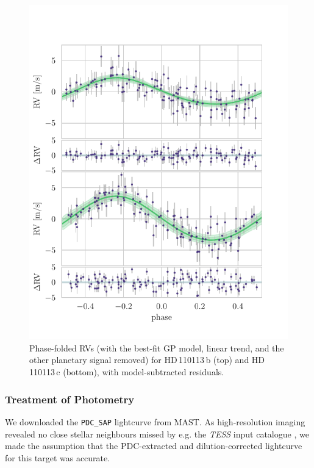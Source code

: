 \documentclass[fleqn,usenatbib]{mnras}
\newcommand{\tess}{{\it TESS}}
\newcommand{\Tplanet}{HD\,110113\,b}
\newcommand{\Tplanetc}{HD\,110113\,c}
\begin{document}
\begin{figure}
	\includegraphics[width=\columnwidth, trim={0.1cm 0.8cm 1.0cm 0.85cm}]{Phase_folded_RV_plots_3_GPs_final.pdf}
    \caption{Phase-folded RVs (with the best-fit GP model, linear trend, and the other planetary signal removed) for \Tplanet{} (top) and \Tplanetc{} (bottom), with model-subtracted residuals. }
    \label{fig:phase_fold_rvs}
\end{figure}

\subsubsection{Treatment of Photometry}
We downloaded the \texttt{PDC\_SAP} lightcurve from MAST.
As high-resolution imaging revealed no close stellar neighbours missed by e.g. the \tess{} input catalogue \citep{stassun2019revised}, we made the assumption that the PDC-extracted and dilution-corrected lightcurve for this target was accurate.
\end{document}

